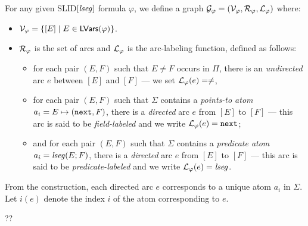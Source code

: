 \documentclass{llncs}
\newcommand{\tl}[1]{\color{blue} {TL: #1 :LT} \color{black}}
\begin{document}
\begin{definition}%
For any given SLID$[\mathit{lseg}]$ formula $\varphi$, we define a graph
 $\mathcal{G}_\varphi=(\mathcal{V}_\varphi, \mathcal{R}_\varphi,   \mathcal{L}_{\varphi})$ where:

\begin{itemize}
\item $\mathcal{V}_\varphi = \{[E] \mid E \in \mathsf{LVars}(\varphi)\}$.



\item  $\mathcal{R}_\varphi$ is the set of arcs and $\mathcal{L}_{\varphi}$ is the arc-labeling function, defined as follows:
\begin{itemize}
\item for each pair $(E, F)$ such that $E \neq F$ occurs in $\Pi$, there is an \emph{undirected} arc $e$ between $[E]$ and $[F]$ --- we set $\mathcal{L}_{\varphi}(e) =\neq$,
%
\item for each pair $(E,F)$ such that $\Sigma$ contains a \emph{points-to atom} $a_i=E \mapsto (\mathtt{next},F)$, there is a \emph{directed} arc $e$ from $[E]$ to $[F]$ --- this arc is said to be \emph{field-labeled} and we write $\mathcal{L}_{\varphi}(e)= \mathtt{next}$;

%
\item and for each pair $(E,F)$ such that $\Sigma$ contains a \emph{predicate atom} $a_i=\mathit{lseg}(E;F)$, there is a \emph{directed} arc $e$ from $[E]$ to $[F]$  --- this arc is said to be \emph{predicate-labeled}  and we write $\mathcal{L}_{\varphi}(e)= \mathit{lseg}$.
\end{itemize}
\end{itemize}
\end{definition}

From the construction, each directed arc $e$ corresponds to a unique atom $a_i$ in $\Sigma$. Let $i(e)$ denote the index $i$ of the atom corresponding to $e$.

\begin{example}
??
\end{example}
\end{document}
